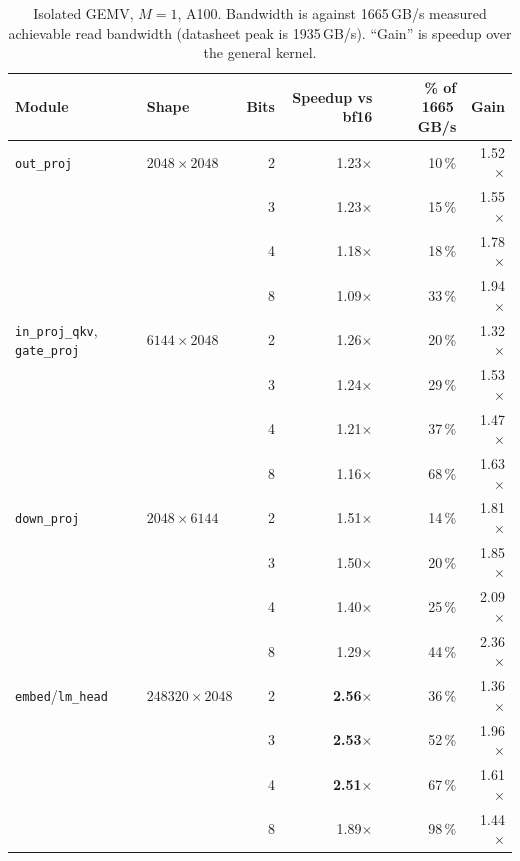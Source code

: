 \documentclass[11pt]{article}
\newcommand{\x}{$\times$}
\newcommand{\pct}{\,\%}
\newcommand{\code}[1]{\texttt{#1}}
\begin{document}
\begin{table}[H]
\centering\small
\caption{Isolated GEMV, $M = 1$, A100. Bandwidth is against 1665\,GB/s measured achievable read
bandwidth (datasheet peak is 1935\,GB/s). ``Gain'' is speedup over the general kernel.}
\begin{tabular}{llrrrr}
\toprule
Module & Shape & Bits & Speedup vs bf16 & \pct{} of 1665\,GB/s & Gain \\
\midrule
\code{out\_proj}    & $2048\times2048$ & 2 & 1.23\x & 10\pct & 1.52\x \\
                    &                  & 3 & 1.23\x & 15\pct & 1.55\x \\
                    &                  & 4 & 1.18\x & 18\pct & 1.78\x \\
                    &                  & 8 & 1.09\x & 33\pct & 1.94\x \\
\rowcolor{rowtint}
\code{in\_proj\_qkv}, \code{gate\_proj} & $6144\times2048$ & 2 & 1.26\x & 20\pct & 1.32\x \\
\rowcolor{rowtint}
                    &                  & 3 & 1.24\x & 29\pct & 1.53\x \\
\rowcolor{rowtint}
                    &                  & 4 & 1.21\x & 37\pct & 1.47\x \\
\rowcolor{rowtint}
                    &                  & 8 & 1.16\x & 68\pct & 1.63\x \\
\code{down\_proj}   & $2048\times6144$ & 2 & 1.51\x & 14\pct & 1.81\x \\
                    &                  & 3 & 1.50\x & 20\pct & 1.85\x \\
                    &                  & 4 & 1.40\x & 25\pct & 2.09\x \\
                    &                  & 8 & 1.29\x & 44\pct & 2.36\x \\
\rowcolor{rowtint}
\code{embed}/\code{lm\_head} & $248320\times2048$ & 2 & \textbf{2.56\x} & 36\pct & 1.36\x \\
\rowcolor{rowtint}
                    &                  & 3 & \textbf{2.53\x} & 52\pct & 1.96\x \\
\rowcolor{rowtint}
                    &                  & 4 & \textbf{2.51\x} & 67\pct & 1.61\x \\
\rowcolor{rowtint}
                    &                  & 8 & 1.89\x & 98\pct & 1.44\x \\
\bottomrule
\end{tabular}
\end{table}
\end{document}
